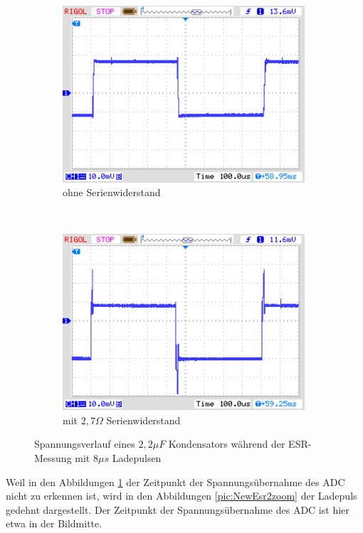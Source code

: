 \begin{figure}[H]
  \begin{subfigure}[b]{9cm}
    \centering
    \includegraphics[width=9cm]{../PNG/NewEsr2u2F0R0.png}
    \caption{ohne Serienwiderstand}
  \end{subfigure}
  ~
  \begin{subfigure}[b]{9cm}
    \centering
    \includegraphics[width=9cm]{../PNG/NewEsr2u2F2R7.png}
    \caption{mit \(2,7\Omega\) Serienwiderstand}
  \end{subfigure}
  \caption{Spannungsverlauf eines \(2,2\mu F\) Kondensators während der ESR-Messung mit \(8 \mu s\) Ladepulsen}
  \label{pic:NewEsr2}
\end{figure}

Weil in den Abbildungen \ref{pic:NewEsr2} der Zeitpunkt der Spannungsübernahme des ADC nicht zu erkennen ist,
wird in den Abbildungen \ref{pic:NewEsr2zoom} der Ladepuls gedehnt dargestellt. Der Zeitpunkt der Spannungsübernahme
des ADC ist hier etwa in der Bildmitte.

